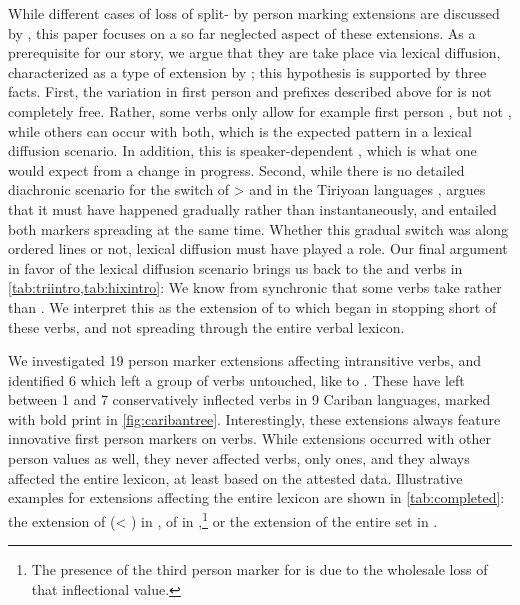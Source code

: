 While different cases of loss of split- by person marking extensions are discussed by \textcite[91--96]{gildea1998}, this paper focuses on a so far neglected aspect of these extensions.
As a prerequisite for our story, we argue that they are take place via lexical diffusion, characterized as a type of extension by \textcite[106--115]{harris1995historical}; this hypothesis is supported by three facts.
First, the variation in first person and  prefixes described above for \kaxui is not completely free.
Rather, some verbs only allow for example first person , but not , while others can occur with both, which is the expected pattern in a lexical diffusion scenario.
In addition, this is speaker-dependent , which is what one would expect from a change in progress.
Second, while there is no detailed diachronic scenario for the switch of >  and  in the Tiriyoan languages , \textcite[111--112]{meira1998proto} argues that it must have happened gradually rather than instantaneously, and entailed both markers spreading at the same time.
Whether this gradual switch was along ordered lines or not, lexical diffusion must have played a role.
Our final argument in favor of the lexical diffusion scenario brings us back to the \hixka and \trio verbs in \cref{tab:triintro,tab:hixintro}:
We know from synchronic \hixka that some  verbs take  rather than .
We interpret this as the extension of   to  which began in \PWai stopping short of these verbs, and not spreading through the entire verbal lexicon.

We investigated 19 person marker extensions affecting intransitive verbs, and identified 6 which left a group of verbs untouched, like \PWai {}  to .
These have left between 1 and 7 conservatively inflected verbs in 9 Cariban languages, marked with bold print in \cref{fig:caribantree}.
Interestingly, these extensions always feature innovative first person markers on  verbs.
While extensions occurred with other person values as well, they never affected  verbs, only  ones, and they always affected the entire lexicon, at least based on the attested data.
Illustrative examples for extensions affecting the entire lexicon are shown in \cref{tab:completed}: the extension of   (< ) in \apalai {}, of   in \panare {},\footnote{The presence of the third person marker  for  is due to the wholesale loss of that inflectional value.} or the extension of the entire  set in \waimiri {}.%

